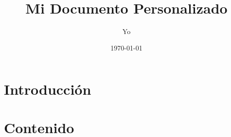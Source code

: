 \documentclass{article}
\title{Mi Documento Personalizado}
\author{Yo}
\date{\today}
\begin{document}
\maketitle

\section{Introducción}
\lipsum[1]

\section{Contenido}
\lipsum[2-4]
\end{document}
